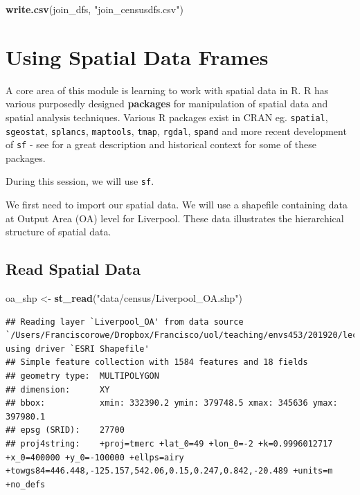 \documentclass[]{book}
\newenvironment{Shaded}{\begin{snugshade}}{\end{snugshade}}
\newcommand{\KeywordTok}[1]{\textcolor[rgb]{0.13,0.29,0.53}{\textbf{#1}}}
\newcommand{\StringTok}[1]{\textcolor[rgb]{0.31,0.60,0.02}{#1}}
\newcommand{\NormalTok}[1]{#1}
\begin{document}
\begin{Shaded}
\begin{Highlighting}[]
\KeywordTok{write.csv}\NormalTok{(join_dfs, }\StringTok{"join_censusdfs.csv"}\NormalTok{)}
\end{Highlighting}
\end{Shaded}

\section{Using Spatial Data Frames}\label{using-spatial-data-frames}

A core area of this module is learning to work with spatial data in R. R
has various purposedly designed \textbf{packages} for manipulation of
spatial data and spatial analysis techniques. Various R packages exist
in CRAN eg. \texttt{spatial}, \texttt{sgeostat}, \texttt{splancs},
\texttt{maptools}, \texttt{tmap}, \texttt{rgdal}, \texttt{spand} and
more recent development of \texttt{sf} - see
\citet{Lovelace_et_al_2020_book} for a great description and historical
context for some of these packages.

During this session, we will use \texttt{sf}.

We first need to import our spatial data. We will use a shapefile
containing data at Output Area (OA) level for Liverpool. These data
illustrates the hierarchical structure of spatial data.

\subsection{Read Spatial Data}\label{read-spatial-data}

\begin{Shaded}
\begin{Highlighting}[]
\NormalTok{oa_shp <-}\StringTok{ }\KeywordTok{st_read}\NormalTok{(}\StringTok{"data/census/Liverpool_OA.shp"}\NormalTok{)}
\end{Highlighting}
\end{Shaded}

\begin{verbatim}
## Reading layer `Liverpool_OA' from data source `/Users/Franciscorowe/Dropbox/Francisco/uol/teaching/envs453/201920/lectures/san/data/census/Liverpool_OA.shp' using driver `ESRI Shapefile'
## Simple feature collection with 1584 features and 18 fields
## geometry type:  MULTIPOLYGON
## dimension:      XY
## bbox:           xmin: 332390.2 ymin: 379748.5 xmax: 345636 ymax: 397980.1
## epsg (SRID):    27700
## proj4string:    +proj=tmerc +lat_0=49 +lon_0=-2 +k=0.9996012717 +x_0=400000 +y_0=-100000 +ellps=airy +towgs84=446.448,-125.157,542.06,0.15,0.247,0.842,-20.489 +units=m +no_defs
\end{verbatim}
\end{document}
